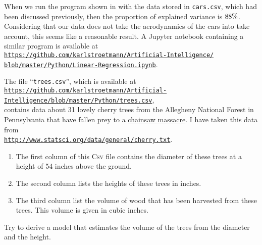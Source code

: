 When we run the program shown in  with the data stored in \texttt{cars.csv},
which had been discussed previously, then the proportion of explained variance is $88 \mathtt{\symbol{37}}$.  Considering that our data does
not take the aerodynamics of the cars into take account, this seems like a reasonable result.  A Jupyter notebook
containing a similar program is available at
\\[0.2cm]
\hspace*{1.3cm}
\href{https://github.com/karlstroetmann/Artificial-Intelligence/blob/master/Python/Linear-Regression.ipynb}{\texttt{https://github.com/karlstroetmann/Artificial-Intelligence/\\
\hspace*{2.2cm}
 blob/master/Python/Linear-Regression.ipynb}}.


\exercise
The file ``\texttt{trees.csv}'', which is available at
\\[0.2cm]
\hspace*{0.3cm}
\href{https://github.com/karlstroetmann/Artificial-Intelligence/blob/master/Python/trees.csv}{\texttt{https://github.com/karlstroetmann/Artificial-Intelligence/blob/master/Python/trees.csv}},
\\[0.2cm]
contains data about 31 lovely cherry trees from the Allegheny National Forest in Pennsylvania that have fallen
prey to a \href{https://en.wikipedia.org/wiki/The_Texas_Chain_Saw_Massacre}{chainsaw massacre}.  I have taken this data from
\\[0.2cm]
\hspace*{1.3cm}
\href{http://www.statsci.org/data/general/cherry.txt}{\texttt{http://www.statsci.org/data/general/cherry.txt}}.
\begin{enumerate}
\item The first column of this \textsc{Csv} file contains the diameter of these trees at a height of 54 inches above
      the ground.
\item The second column lists the heights of these trees in inches.
\item The third column list the volume of wood that has been harvested from these trees.  This volume is given
      in cubic inches.
\end{enumerate}
Try to derive a model that estimates the volume of the trees from the diameter and the height.
\eox


